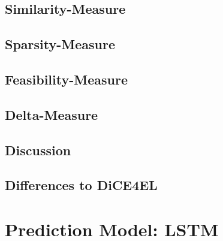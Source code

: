 \documentclass[12pt,a4paper]{report}
\begin{document}
\subsection{Similarity-Measure}
\label{sec:similarity}


\subsection{Sparsity-Measure}
\label{sec:sparcity}


\subsection{Feasibility-Measure}
\label{sec:feasibility}




\subsection{Delta-Measure}
\label{sec:delta}


\subsection{Discussion}


\subsection{Differences to DiCE4EL}

 


\section{Prediction Model: LSTM}
\label{sec:model_prediction}



% 
\end{document}
